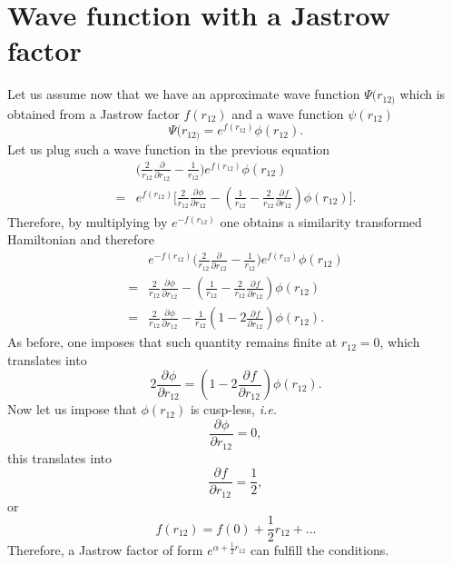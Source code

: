 \documentclass[aip,jcp,reprint,noshowkeys,superscriptaddress]{revtex4-1}
\newcommand{\deriv}[3]{\frac{\partial^{#3} #1}{\partial {#2}^{#3}}}
\begin{document}
\section{Wave function with a Jastrow factor}
Let us assume now that we have an approximate wave function $\Psi(r_{12)}$ which is obtained from a Jastrow factor $f(r_{12})$ and a wave function $\psi(r_{12})$
\begin{equation}
  \Psi(r_{12)} = e^{f(r_{12})} \phi(r_{12}). 
\end{equation}
Let us plug such a wave function in the previous equation
\begin{equation}
 \begin{aligned}
 & \bigg( \frac{2}{r_{12}} \deriv{}{r_{12}}{} -\frac{1}{r_{12}}\bigg) e^{f(r_{12})} \phi(r_{12}) \\
 = & e^{f(r_{12})} \bigg[ \frac{2}{r_{12}} \deriv{\phi}{r_{12}}{} - \left( \frac{1}{r_{12}} - \frac{2}{r_{12}}\deriv{f}{r_{12}}{} \right) \phi(r_{12}) \bigg].
 \end{aligned}
\end{equation}
Therefore, by multiplying by $e^{-f(r_{12})}$ one obtains a similarity transformed Hamiltonian and therefore 
\begin{equation}
 \label{eq:eff_h}
 \begin{aligned}
 & e^{-f(r_{12})} \bigg( \frac{2}{r_{12}} \deriv{}{r_{12}}{} -\frac{1}{r_{12}}\bigg) e^{f(r_{12})} \phi(r_{12}) \\ 
=& \frac{2}{r_{12}} \deriv{\phi}{r_{12}}{} - \left( \frac{1}{r_{12}} -  \frac{2}{r_{12}}\deriv{f}{r_{12}}{} \right) \phi(r_{12}) \\
=& \frac{2}{r_{12}} \deriv{\phi}{r_{12}}{} - \frac{1}{r_{12}} \left( 1-  2 \deriv{f}{r_{12}}{} \right) \phi(r_{12}). 
 \end{aligned}
\end{equation}
As before, one imposes that such quantity remains finite at $r_{12} = 0$, which translates into
\begin{equation}
 2 \deriv{\phi}{r_{12}}{} = \left( 1-  2 \deriv{f}{r_{12}}{} \right) \phi(r_{12}). 
\end{equation}
Now let us impose that $\phi(r_{12})$ is cusp-less, \textit{i.e.}
\begin{equation}
 \deriv{\phi}{r_{12}}{} = 0, 
\end{equation}
this translates into 
\begin{equation}
 \deriv{f}{r_{12}}{} = \frac{1}{2}, 
\end{equation}
or 
\begin{equation}
 f(r_{12}) = f(0) + \frac{1}{2} r_{12} + \hdots 
\end{equation}
Therefore, a Jastrow factor of form $e^{\alpha + \frac{1}{2} r_{12}}$ can fulfill the conditions. 
\end{document}
